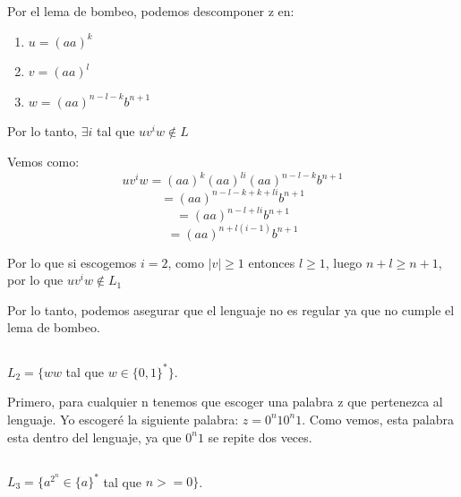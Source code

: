\documentclass[12pt, spanish]{article}
\begin{document}
Por el lema de bombeo, podemos descomponer z en:

\begin{enumerate}
	\item $u = (aa)^k$
	\item $v = (aa)^l$
	\item $w = (aa)^{n - l - k}b^{n+1}$
\end{enumerate}

Por lo tanto, $\exists i$ tal que $uv^iw \not \in L$

\newpage

Vemos como:
	$$uv^iw = (aa)^k(aa)^{li}(aa)^{n-l-k}b^{n+1}$$ 
	$$ =  (aa)^{n - l - k + k + li}b^{n+1} $$
	$$ =  (aa)^{n - l  + li}b^{n+1}$$
	$$ =  (aa)^{n + l(i - 1)}b^{n+1}  $$

Por lo que si escogemos $i = 2$, como $|v| \geq 1$ entonces $l \geq 1$, luego $n+l \geq n+1$, por lo que $uv^iw \not \in L_1$

Por lo tanto, podemos asegurar que el lenguaje no es regular ya que no cumple el lema de bombeo.


\subsection{}
 $L_2 = \{ ww $ tal que  $ w \in \{0,1\}^* \}$.
 
Primero, para cualquier n tenemos que escoger una palabra z que pertenezca al lenguaje. Yo escogeré la siguiente palabra: $z = 0^n10^n1$. Como vemos, esta palabra esta dentro del lenguaje, ya que $0^n1$ se repite dos veces.
 
 \subsection{}
 $L_3 = \{ a^{2^n} \in \{a\}^{*} $ tal que  $ n >= 0 \}$.
\end{document}

